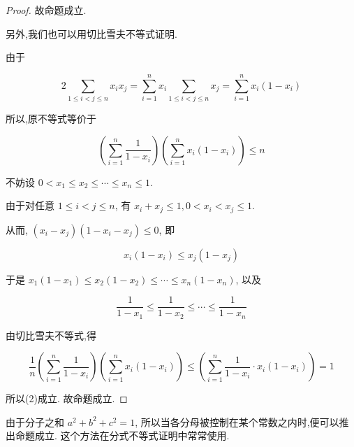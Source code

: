 \begin{proof}
	故命题成立.
	
	另外,我们也可以用切比雪夫不等式证明.
	
	由于
	
	$$
	2 \sum_{1 \leqslant i<j \leqslant n} x_{i} x_{j}=\sum_{i=1}^{n} x_{i} \sum_{1 \leqslant i<j \leqslant n} x_{j}=\sum_{i=1}^{n} x_{i}\left(1-x_{i}\right)
	$$
	
	所以,原不等式等价于
	
	
	\begin{equation*}
	\left(\sum_{i=1}^{n} \frac{1}{1-x_{i}}\right)\left(\sum_{i=1}^{n} x_{i}\left(1-x_{i}\right)\right) \leqslant n \tag{2}
	\end{equation*}
	
	
	不妨设 $0<x_{1} \leqslant x_{2} \leqslant \cdots \leqslant x_{n} \leqslant 1$.
	
	由于对任意 $1 \leqslant i<j \leqslant n$, 有 $x_{i}+x_{j} \leqslant 1,0<x_{i}<x_{j} \leqslant 1$.
	
	从而, $\left(x_{i}-x_{j}\right)\left(1-x_{i}-x_{j}\right) \leqslant 0$, 即
	
	$$
	x_{i}\left(1-x_{i}\right) \leqslant x_{j}\left(1-x_{j}\right)
	$$
	
	于是 $x_{1}\left(1-x_{1}\right) \leqslant x_{2}\left(1-x_{2}\right) \leqslant \cdots \leqslant x_{n}\left(1-x_{n}\right)$, 以及
	
	$$
	\frac{1}{1-x_{1}} \leqslant \frac{1}{1-x_{2}} \leqslant \cdots \leqslant \frac{1}{1-x_{n}}
	$$
	
	由切比雪夫不等式,得
	
	$$
	\frac{1}{n}\left(\sum_{i=1}^{n} \frac{1}{1-x_{i}}\right)\left(\sum_{i=1}^{n} x_{i}\left(1-x_{i}\right)\right) \leqslant\left(\sum_{i=1}^{n} \frac{1}{1-x_{i}} \cdot x_{i}\left(1-x_{i}\right)\right)=1
	$$
	
	所以(2)成立. 故命题成立.
\end{proof}
\begin{note}
	由于分子之和 $a^{2}+b^{2}+c^{2}=1$, 所以当各分母被控制在某个常数之内时,便可以推出命题成立. 这个方法在分式不等式证明中常常使用.
\end{note}

